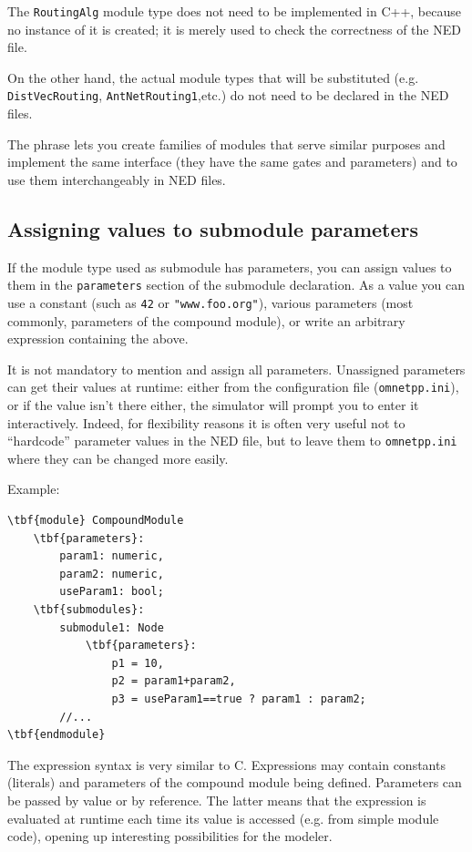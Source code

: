The \texttt{RoutingAlg} module type does not need to be implemented in
C++, because no instance of it is created; it is merely used
to check the correctness of the NED file.

On the other hand, the actual module types that will be substituted
(e.g. \texttt{DistVecRouting}, \texttt{AntNetRouting1},etc.)
do not need to be declared in the NED files.

The  phrase lets you create families
of modules that serve similar purposes and implement the same interface
(they have the same gates and parameters)
and to use them interchangeably in NED files.




\subsection{Assigning values to submodule parameters}


If the module type used as submodule has parameters, you can assign
values to them in the \texttt{parameters} section of the submodule
declaration.
As a value you can use a constant (such as \texttt{42} or
\texttt{"www.foo.org"}), various parameters (most commonly, parameters
of the compound module), or write an arbitrary expression containing
the above.

It is not mandatory to mention and assign all parameters.
Unassigned parameters can get their values at runtime: either from
the configuration file (\texttt{omnetpp.ini}), or if the value
isn't there either, the simulator will prompt you to enter it
interactively. Indeed, for flexibility reasons it is often very useful
not to ``hardcode'' parameter values in the NED file,
but to leave them to \texttt{omnetpp.ini} where they can be
changed more easily.


Example:

\begin{Verbatim}[commandchars=\\\{\}]
\tbf{module} CompoundModule
    \tbf{parameters}:
        param1: numeric,
        param2: numeric,
        useParam1: bool;
    \tbf{submodules}:
        submodule1: Node
            \tbf{parameters}:
                p1 = 10,
                p2 = param1+param2,
                p3 = useParam1==true ? param1 : param2;
        //...
\tbf{endmodule}
\end{Verbatim}


The expression syntax  is very similar to C.
Expressions may contain constants (literals) and parameters of the
compound module being defined. Parameters can be passed by value
or by reference. The latter means that the expression is evaluated
at runtime each time its value is accessed (e.g. from simple module
code), opening up interesting possibilities for the modeler.

